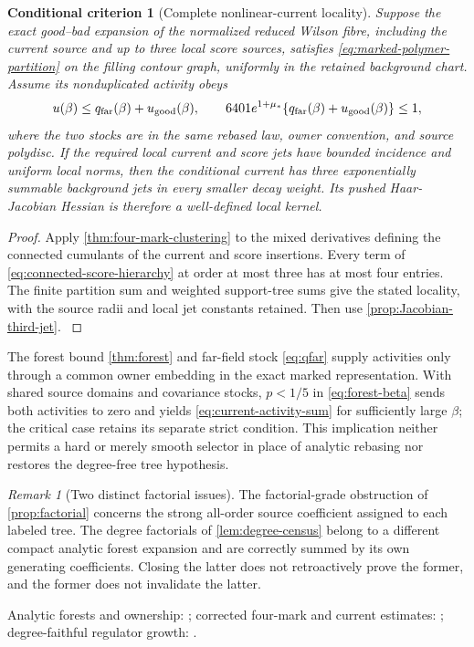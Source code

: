 \documentclass[11pt,oneside,openany]{book}
\newtheorem{criterion}[criterion]{Conditional criterion}
\theoremstyle{definition}
\theoremstyle{remark}
\newtheorem{remark}[remark]{Remark}
\newcommand{\src}[2]{\cite[#2]{#1}}
\newcommand{\sourcebasis}[1]{\par\smallskip\noindent #1\par}
\begin{document}
\begin{criterion}[Complete nonlinear-current locality]
\label{crit:nonlinear-current-gate}
Suppose the exact good--bad expansion of the normalized reduced Wilson
fibre, including the current source and up to three local score
sources, satisfies \cref{eq:marked-polymer-partition} on the filling
contour graph, uniformly in the retained background chart. Assume its
nonduplicated activity obeys
\begin{equation}\label{eq:current-activity-sum}
u(\beta)\le q_{\rm far}(\beta)+u_{\rm good}(\beta),
\qquad
6401e^{1+\mu_*}\{q_{\rm far}(\beta)+u_{\rm good}(\beta)\}\le1,
\end{equation}
where the two stocks are in the same rebased law, owner convention,
and source polydisc. If the required local current and score jets
have bounded incidence and uniform local norms, then the conditional
current has three exponentially summable background jets in every
smaller decay weight. Its pushed Haar-Jacobian Hessian is therefore a
well-defined local kernel.
\end{criterion}
\begin{proof}
Apply \cref{thm:four-mark-clustering} to the mixed derivatives defining
the connected cumulants of the current and score insertions. Every
term of \cref{eq:connected-score-hierarchy} at order at most three has
at most four entries. The finite partition sum and weighted
support-tree sums give the stated locality, with the source radii and
local jet constants retained. Then use
\cref{prop:Jacobian-third-jet}. \src{F8}{V59--V63}
\end{proof}

The forest bound \cref{thm:forest} and far-field stock \cref{eq:qfar}
supply activities only through a common owner embedding in the exact
marked representation. With shared source domains and covariance
stocks, $p<1/5$ in \cref{eq:forest-beta} sends both activities to zero
and yields \cref{eq:current-activity-sum} for sufficiently large $\beta$;
the critical case retains its separate strict condition. This implication
neither permits a hard or merely smooth selector in place of analytic
rebasing nor restores the degree-free tree hypothesis.


\begin{remark}[Two distinct factorial issues]
The factorial-grade obstruction of \cref{prop:factorial} concerns the strong all-order source coefficient assigned to each labeled tree. The degree factorials of \cref{lem:degree-census} belong to a different compact analytic forest expansion and are correctly summed by its own generating coefficients. Closing the latter does not retroactively prove the former, and the former does not invalidate the latter.
\end{remark}
\sourcebasis{Analytic forests and ownership: \src{F9}{V1--V8}; corrected four-mark and current estimates: \src{F8}{V60--V65}; degree-faithful regulator growth: \src{F10}{V100}.}
\end{document}

